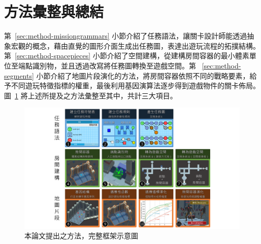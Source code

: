 \section{方法彙整與總結}
\label{sec:method-summary}

第~\ref{sec:method-missiongrammars} 小節介紹了任務語法，讓關卡設計師能透過抽象宏觀的概念，藉由直覺的圖形介面生成出任務圖，表達出遊玩流程的拓撲結構。第~\ref{sec:method-spacepieces} 小節介紹了空間建構，從建構房間容器的最小體素單位至端點識別物，並且透過改寫將任務圖轉換至遊戲空間。第 ~\ref{sec:method-segments} 小節介紹了地圖片段演化的方法，將房間容器依照不同的戰略要素，給予不同遊玩特徵指標的權重，最後利用基因演算法逐步得到遊戲物件的關卡佈局。圖~\ref{fig:completed-framework} 將上述所提及之方法彙整至其中，共計三大項目。

\begin{landscape}
  \begin{figure}[!htb]
    \begin{center}
      \includegraphics[width=1.0\linewidth]{figures/completed-framework.pdf}
      \caption{本論文提出之方法，完整框架示意圖} 
      \label{fig:completed-framework}
    \end{center}
  \end{figure}
\end{landscape}